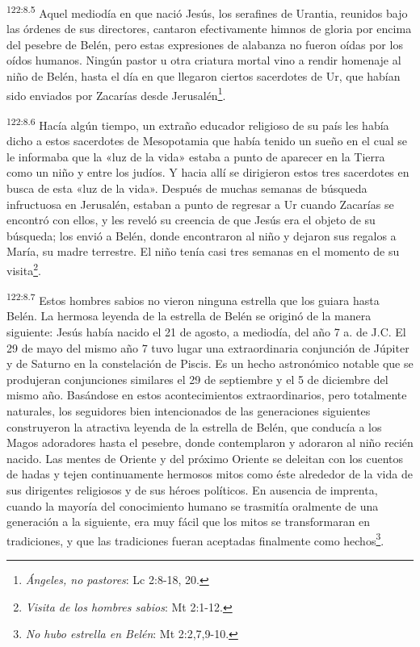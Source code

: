 \par
\textsuperscript{122:8.5} Aquel mediodía en que nació Jesús, los serafines de Urantia, reunidos bajo las órdenes de sus directores, cantaron efectivamente himnos de gloria por encima del pesebre de Belén, pero estas expresiones de alabanza no fueron oídas por los oídos humanos. Ningún pastor u otra criatura mortal vino a rendir homenaje al niño de Belén, hasta el día en que llegaron ciertos sacerdotes de Ur, que habían sido enviados por Zacarías desde Jerusalén\footnote{\textit{Ángeles, no pastores}: Lc 2:8-18, 20.}.

\par
\textsuperscript{122:8.6} Hacía algún tiempo, un extraño educador religioso de su país les había dicho a estos sacerdotes de Mesopotamia que había tenido un sueño en el cual se le informaba que la «luz de la vida» estaba a punto de aparecer en la Tierra como un niño y entre los judíos. Y hacia allí se dirigieron estos tres sacerdotes en busca de esta «luz de la vida». Después de muchas semanas de búsqueda infructuosa en Jerusalén, estaban a punto de regresar a Ur cuando Zacarías se encontró con ellos, y les reveló su creencia de que Jesús era el objeto de su búsqueda; los envió a Belén, donde encontraron al niño y dejaron sus regalos a María, su madre terrestre. El niño tenía casi tres semanas en el momento de su visita\footnote{\textit{Visita de los hombres sabios}: Mt 2:1-12.}.

\par
\textsuperscript{122:8.7} Estos hombres sabios no vieron ninguna estrella que los guiara hasta Belén. La hermosa leyenda de la estrella de Belén se originó de la manera siguiente: Jesús había nacido el 21 de agosto, a mediodía, del año 7 a. de J.C. El 29 de mayo del mismo año 7 tuvo lugar una extraordinaria conjunción de Júpiter y de Saturno en la constelación de Piscis. Es un hecho astronómico notable que se produjeran conjunciones similares el 29 de septiembre y el 5 de diciembre del mismo año. Basándose en estos acontecimientos extraordinarios, pero totalmente naturales, los seguidores bien intencionados de las generaciones siguientes construyeron la atractiva leyenda de la estrella de Belén, que conducía a los Magos adoradores hasta el pesebre, donde contemplaron y adoraron al niño recién nacido. Las mentes de Oriente y del próximo Oriente se deleitan con los cuentos de hadas y tejen continuamente hermosos mitos como éste alrededor de la vida de sus dirigentes religiosos y de sus héroes políticos. En ausencia de imprenta, cuando la mayoría del conocimiento humano se trasmitía oralmente de una generación a la siguiente, era muy fácil que los mitos se transformaran en tradiciones, y que las tradiciones fueran aceptadas finalmente como hechos\footnote{\textit{No hubo estrella en Belén}: Mt 2:2,7,9-10.}.

